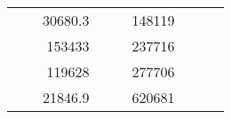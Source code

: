 \begin{table}[H]
\begin{tabular}{|ccrccrccc}
\multicolumn{1}{|c|}{\cellcolor[HTML]{FFFFC7}}                                & \multicolumn{1}{c|}{\cellcolor[HTML]{DDFDFF}}                      & \multicolumn{1}{r|}{\cellcolor[HTML]{DAE8FC}30680.3}   & \multicolumn{1}{c|}{\cellcolor[HTML]{FFFFC7}}                                & \multicolumn{1}{c|}{\cellcolor[HTML]{DDFDFF}}                       & \multicolumn{1}{r|}{\cellcolor[HTML]{DDFDFF}148119}    &                                                                              &                                                                    &                                                        \\ \cline{3-3} \cline{6-6}
\multicolumn{1}{|c|}{\cellcolor[HTML]{FFFFC7}}                                & \multicolumn{1}{c|}{\cellcolor[HTML]{DDFDFF}}                      & \multicolumn{1}{r|}{\cellcolor[HTML]{DDFDFF}153433}    & \multicolumn{1}{c|}{\cellcolor[HTML]{FFFFC7}}                                & \multicolumn{1}{c|}{\cellcolor[HTML]{DDFDFF}}                       & \multicolumn{1}{r|}{\cellcolor[HTML]{DAE8FC}237716}    &                                                                              &                                                                    &                                                        \\ \cline{3-3} \cline{6-6}
\multicolumn{1}{|c|}{\cellcolor[HTML]{FFFFC7}}                                & \multicolumn{1}{c|}{\cellcolor[HTML]{DDFDFF}}                      & \multicolumn{1}{r|}{\cellcolor[HTML]{DAE8FC}119628}    & \multicolumn{1}{c|}{\cellcolor[HTML]{FFFFC7}}                                & \multicolumn{1}{c|}{\cellcolor[HTML]{DDFDFF}}                       & \multicolumn{1}{r|}{\cellcolor[HTML]{DDFDFF}277706}    &                                                                              &                                                                    &                                                        \\ \cline{3-3} \cline{6-6}
\multicolumn{1}{|c|}{\cellcolor[HTML]{FFFFC7}}                                & \multicolumn{1}{c|}{\cellcolor[HTML]{DDFDFF}}                      & \multicolumn{1}{r|}{\cellcolor[HTML]{DDFDFF}21846.9}   & \multicolumn{1}{c|}{\cellcolor[HTML]{FFFFC7}}                                & \multicolumn{1}{c|}{\cellcolor[HTML]{DDFDFF}}                       & \multicolumn{1}{r|}{\cellcolor[HTML]{DAE8FC}620681}    &                                                                              &                                                                    &                                                        \\ \cline{3-3} \cline{6-6}

\end{tabular}
\end{table}
